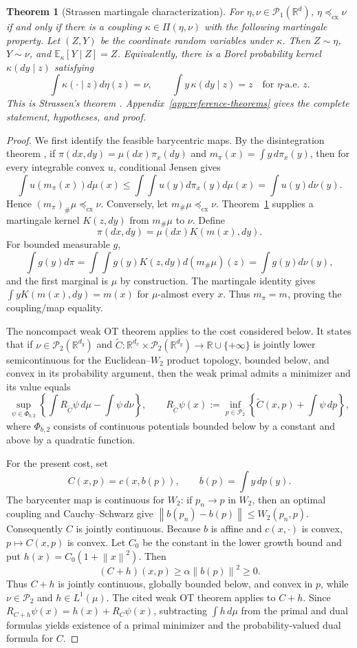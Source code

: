 \documentclass[10pt,a4paper]{amsart}
\newtheorem{theorem}{Theorem}
\newcommand{\E}{\mathbb E}
\newcommand{\R}{\mathbb R}
\newcommand{\cP}{\mathcal P}
\newcommand{\cx}{\preceq_{\mathrm{cx}}}
\newcommand{\norm}[1]{\left\lVert #1\right\rVert}
\begin{document}
\begin{theorem}[Strassen martingale characterization]\label{thm:strassen}
For $\eta,\nu\in\cP_1(\R^d)$, $\eta\cx\nu$ if and only if there is a coupling
$\kappa\in\Pi(\eta,\nu)$ with the following martingale property. Let $(Z,Y)$ be
the coordinate random variables under $\kappa$. Then $Z\sim\eta$, $Y\sim\nu$, and
$\E_\kappa[Y\mid Z]=Z$. Equivalently, there is a
Borel probability kernel $\kappa(dy\mid z)$ satisfying
\[
  \int\kappa(\mathord\cdot\mid z)d\eta(z)=\nu,
  \qquad \int y\,\kappa(dy\mid z)=z\quad\text{for $\eta$-a.e. }z.
\]
This is Strassen's theorem \cite{Strassen}.
Appendix~\ref{app:reference-theorems} gives the complete statement, hypotheses,
and proof.
\end{theorem}

\begin{proof}
We first identify the feasible barycentric maps.  By the disintegration theorem
\cite[Theorem~3.4]{Kallenberg}, if
$\pi(dx,dy)=\mu(dx)\pi_x(dy)$ and $m_\pi(x)=\int y\,d\pi_x(y)$, then for every
integrable convex $u$, conditional Jensen gives
\[
 \int u(m_\pi(x))d\mu(x)
 \le\int\!\int u(y)d\pi_x(y)d\mu(x)=\int u(y)d\nu(y).
\]
Hence $(m_\pi)_\#\mu\cx\nu$.  Conversely, let $m_\#\mu\cx\nu$.
Theorem~\ref{thm:strassen} supplies a martingale kernel $K(z,dy)$ from
$m_\#\mu$ to $\nu$.  Define
\[
 \pi(dx,dy)=\mu(dx)K(m(x),dy).
\]
For bounded measurable $g$,
\[
 \int g(y)d\pi=\int\!\int g(y)K(z,dy)d(m_\#\mu)(z)=\int g(y)d\nu(y),
\]
and the first marginal is $\mu$ by construction.  The martingale identity gives
$\int yK(m(x),dy)=m(x)$ for $\mu$-almost every $x$.  Thus $m_\pi=m$, proving
the coupling/map equality.

The noncompact weak OT theorem
\cite[Theorems~2.9 and~3.1]{BBP} applies to the cost considered below.  It states
that if
$\nu\in\cP_2(\R^{d_y})$ and
$\widetilde C:\R^{d_x}\times\cP_2(\R^{d_y})\to\R\cup\{+\infty\}$ is jointly
lower semicontinuous for the Euclidean--$W_2$ product topology, bounded below, and
convex in its probability argument, then the weak primal admits a minimizer and
its value equals
\[
 \sup_{\psi\in\Phi_{b,2}}
 \left\{\int R_{\widetilde C}\psi\,d\mu-\int\psi\,d\nu\right\},
 \qquad
 R_{\widetilde C}\psi(x)
 :=\inf_{p\in\cP_2}\left\{\widetilde C(x,p)+\int\psi\,dp\right\},
\]
where $\Phi_{b,2}$ consists of continuous potentials bounded below by a constant
and above by a quadratic function.

For the present cost, set
\[
 C(x,p)=c(x,b(p)),\qquad b(p)=\int y\,dp(y).
\]
The barycenter map is continuous for $W_2$: if $p_n\to p$ in $W_2$, then an
optimal coupling and Cauchy--Schwarz give
$\norm{b(p_n)-b(p)}\le W_2(p_n,p)$.  Consequently $C$ is jointly continuous.
Because $b$ is affine and $c(x,\cdot)$ is convex, $p\mapsto C(x,p)$ is convex.
Let $C_0$ be the constant in the lower growth bound and put
$h(x)=C_0(1+\norm x^2)$.  Then
\[
 (C+h)(x,p)\ge\alpha\norm{b(p)}^2\ge0.
\]
Thus $C+h$ is jointly continuous, globally bounded below, and convex in $p$, while
$\nu\in\cP_2$ and $h\in L^1(\mu)$.  The cited weak OT theorem applies to
$C+h$.  Since $R_{C+h}\psi(x)=h(x)+R_C\psi(x)$, subtracting $\int h\,d\mu$ from
the primal and dual formulas yields existence of a primal minimizer and the probability-valued
dual formula for $C$.


\end{proof}
\end{document}
